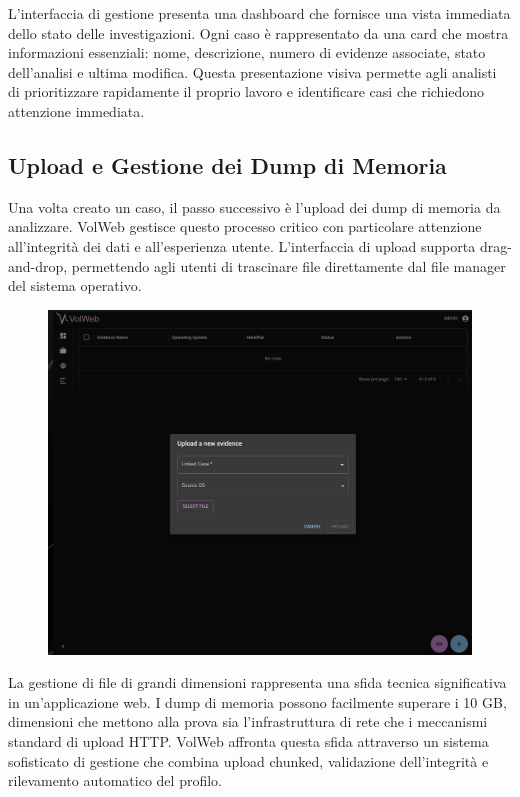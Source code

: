 L'interfaccia di gestione presenta una dashboard che fornisce una vista immediata dello stato delle investigazioni. Ogni caso è rappresentato da una card che mostra informazioni essenziali: nome, descrizione, numero di evidenze associate, stato dell'analisi e ultima modifica. Questa presentazione visiva permette agli analisti di prioritizzare rapidamente il proprio lavoro e identificare casi che richiedono attenzione immediata.

\subsection{Upload e Gestione dei Dump di Memoria}

Una volta creato un caso, il passo successivo è l'upload dei dump di memoria da analizzare. VolWeb gestisce questo processo critico con particolare attenzione all'integrità dei dati e all'esperienza utente. L'interfaccia di upload supporta drag-and-drop, permettendo agli utenti di trascinare file direttamente dal file manager del sistema operativo.

\begin{figure}[H]
    \centering
    \includegraphics[width=0.9\linewidth]{images/volweb-original/volweb-upload-interface.png}
\end{figure}

La gestione di file di grandi dimensioni rappresenta una sfida tecnica significativa in un'applicazione web. I dump di memoria possono facilmente superare i 10 GB, dimensioni che mettono alla prova sia l'infrastruttura di rete che i meccanismi standard di upload HTTP. VolWeb affronta questa sfida attraverso un sistema sofisticato di gestione che combina upload chunked, validazione dell'integrità e rilevamento automatico del profilo.

